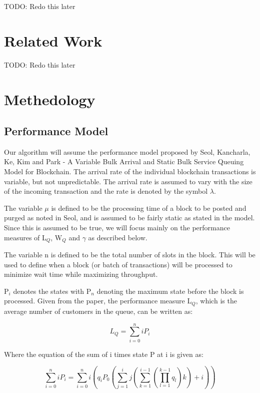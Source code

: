 \documentclass[conference]{IEEEtran}
\begin{document}
TODO: Redo this later

\section{Related Work}\label{related}

TODO: Redo this later

\section{Methedology}
\subsection{Performance Model}\label{Model}
Our algorithm will assume the performance model proposed by Seol, Kancharla, Ke, Kim and Park
 - A Variable Bulk Arrival and Static Bulk Service Queuing Model for Blockchain\cite{2020_ACM_Seol}. 
 The arrival rate of the individual blockchain transactions is variable, but not unpredictable. 
 The arrival rate is assumed to vary with the size of the incoming transaction and the rate is 
 denoted by the symbol $\lambda$.

The variable $\mu$ is defined to be the processing time of a block to be posted and purged as noted 
in Seol\cite{2020_ACM_Seol}, and is assumed to be fairly static as stated in the model. Since this is 
assumed to be true, we will focus mainly on the performance measures of L$_Q$, W$_Q$ and $\gamma$ 
as described below.

The variable n is defined to be the total number of slots in the block. This will be used to 
define when a block (or batch of transactions) will be processed to minimize wait time while 
maximizing throughput. 

P$_i$ denotes the states with P$_n$ denoting the maximum state before the block is processed. Given 
from the paper, the performance measure L$_Q$, which is the average number of customers in the 
queue, can be written as:

\begin{equation}
L_Q=\sum_{i=0}^niP_i\label{LQ_eq}
\end{equation}

Where the equation of the sum of i times state P at i is given as:

\begin{equation}
\sum_{i=0}^niP_i=\sum_{i=0}^ni(q_iP_0(\sum_{j=1}^ij(\sum_{k=1}^{i-1}(\prod_{l=1}^{k-1}q_l)k)+i))\label{sumiPi_eq}
\end{equation}
\end{document}
